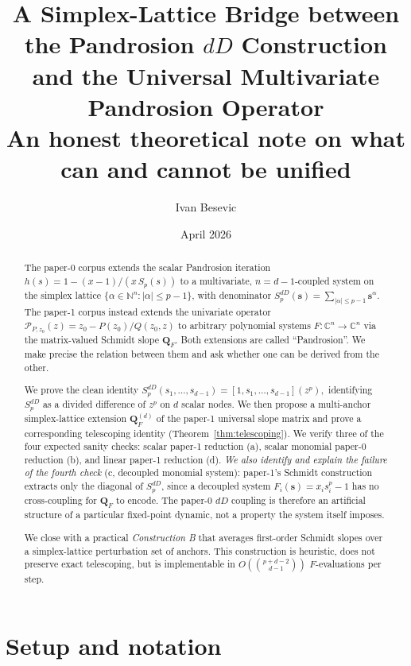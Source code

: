 \documentclass[11pt,a4paper]{article}
\title{\textbf{A Simplex-Lattice Bridge between the Pandrosion $dD$ Construction and the Universal Multivariate Pandrosion Operator}\\[0.3em]
\large An honest theoretical note on what can and cannot be unified}
\author{Ivan Besevic}
\date{April 2026}
\theoremstyle{definition}
\theoremstyle{remark}
\newcommand{\C}{\mathbb{C}}
\newcommand{\N}{\mathbb{N}}
\newcommand{\sbf}{\mathbf{s}}
\newcommand{\Qb}{\mathbf{Q}}
\begin{document}
\maketitle

\begin{abstract}
The paper-0 corpus extends the scalar Pandrosion iteration $h(s) = 1 - (x-1)/(x\,S_p(s))$
to a multivariate, $n=d-1$-coupled system on the simplex lattice
$\{\alpha \in \N^{n} : |\alpha| \le p-1\}$, with denominator
$S_p^{dD}(\sbf) = \sum_{|\alpha|\le p-1} \sbf^\alpha$.
The paper-1 corpus instead extends the univariate operator
$\mathcal{P}_{P, z_0}(z) = z_0 - P(z_0)/Q(z_0,z)$ to arbitrary polynomial systems
$F : \C^n \to \C^n$ via the matrix-valued Schmidt slope $\Qb_F$.
Both extensions are called ``Pandrosion''. We make precise the relation between
them and ask whether one can be derived from the other.

We prove the clean identity
$
S_p^{dD}(s_1,\dots,s_{d-1}) = [1, s_1, \dots, s_{d-1}](z^p),
$
identifying $S_p^{dD}$ as a divided difference of $z^p$ on $d$ scalar nodes.
We then propose a multi-anchor simplex-lattice extension $\Qb_F^{(d)}$ of the
paper-1 universal slope matrix and prove a corresponding telescoping identity
(Theorem~\ref{thm:telescoping}). We verify three of the four expected sanity
checks: scalar paper-1 reduction (a), scalar monomial paper-0 reduction (b),
and linear paper-1 reduction (d). \emph{We also identify and explain the
failure of the fourth check} (c, decoupled monomial system): paper-1's Schmidt
construction extracts only the diagonal of $S_p^{dD}$, since a decoupled
system $F_i(\sbf) = x_i s_i^p - 1$ has no cross-coupling for $\Qb_F$ to encode.
The paper-0 $dD$ coupling is therefore an artificial structure of a particular
fixed-point dynamic, not a property the system itself imposes.

We close with a practical \emph{Construction B} that averages first-order
Schmidt slopes over a simplex-lattice perturbation set of anchors. This
construction is heuristic, does not preserve exact telescoping, but is
implementable in $O(\binom{p+d-2}{d-1})$ $F$-evaluations per step.
\end{abstract}

\section{Setup and notation}
\end{document}
